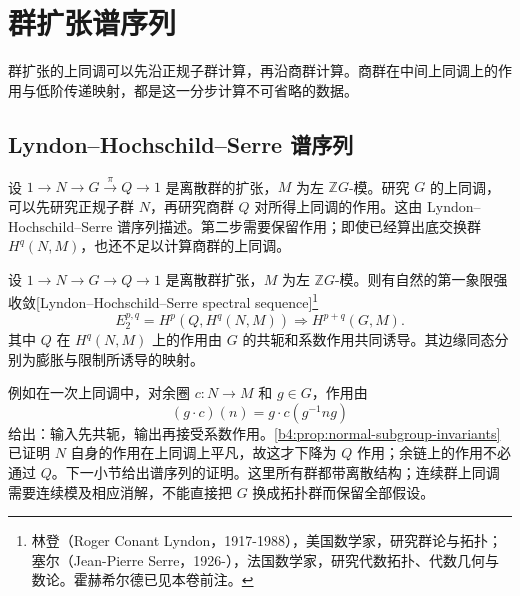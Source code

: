 
\section{群扩张谱序列}
\label{b4:sec:1504}

群扩张的上同调可以先沿正规子群计算，再沿商群计算。商群在中间上同调上的作用与低阶传递映射，都是这一分步计算不可省略的数据。

%
%
%

\subsection{Lyndon–Hochschild–Serre 谱序列}
\label{b4:subsec:1504:01}

设 \(1\to N\to G\xrightarrow{\pi}Q\to1\) 是离散群的扩张，\(M\) 为左 \(\mathbb ZG\)-模。研究 \(G\) 的上同调，可以先研究正规子群 \(N\)，再研究商群 \(Q\) 对所得上同调的作用。这由 Lyndon--Hochschild--Serre 谱序列描述。第二步需要保留作用；即使已经算出底交换群 \(H^q(N,M)\)，也还不足以计算商群的上同调。

\begin{theorem}\label{b4:thm:lhs-spectral-sequence}
	设 \(1\to N\to G\to Q\to1\) 是离散群扩张，\(M\) 为左 \(\mathbb ZG\)-模。则有自然的第一象限强收敛[Lyndon--Hochschild--Serre spectral sequence]\footnote{林登（Roger Conant Lyndon，1917-1988），美国数学家，研究群论与拓扑；塞尔（Jean-Pierre Serre，1926-），法国数学家，研究代数拓扑、代数几何与数论。霍赫希尔德已见本卷前注。}
	\[
		E_2^{p,q}=H^p(Q,H^q(N,M))\Longrightarrow H^{p+q}(G,M).
	\]
	其中 \(Q\) 在 \(H^q(N,M)\) 上的作用由 \(G\) 的共轭和系数作用共同诱导。其边缘同态分别为膨胀与限制所诱导的映射。
\end{theorem}

例如在一次上同调中，对余圈 \(c:N\to M\) 和 \(g\in G\)，作用由
\[
	(g\cdot c)(n)=g\cdot c(g^{-1}ng)
\]
给出：输入先共轭，输出再接受系数作用。\cref{b4:prop:normal-subgroup-invariants}已证明 \(N\) 自身的作用在上同调上平凡，故这才下降为 \(Q\) 作用；余链上的作用不必通过 \(Q\)。下一小节给出谱序列的证明。这里所有群都带离散结构；连续群上同调需要连续模及相应消解，不能直接把 \(G\) 换成拓扑群而保留全部假设。

